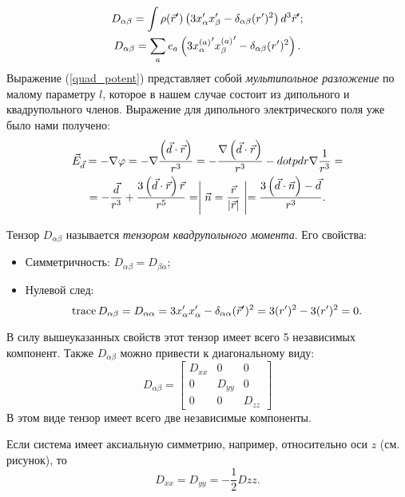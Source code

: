     \begin{gather*}
        D_{\alpha\beta} = \int\rho(\vec{r}')\left({3x_{\alpha}'x_{\beta}' - \delta_{\alpha\beta}(r')^2}\right)d^3\vec{r}';\\
        D_{\alpha\beta} = \sum_a e_a \left({3{x_{\alpha}^{(a)}}' {x_{\beta}^{(a)}}' - \delta_{\alpha\beta}(r')^2}\right).
    \end{gather*}
    Выражение (\ref{quad_potent}) представляет собой \textit{мультипольное разложение} по малому параметру $l$, которое в нашем случае состоит из дипольного и квадрупольного членов.
    Выражение для дипольного электрического поля уже было нами получено:
    \begin{gather*}
        \vec{E}_{\vec{d}} = -\nabla\varphi = -\nabla\frac{\left({\vec{d}\cdot\vec{r}}\right)}{r^3} = -\frac{\nabla\left({\vec{d}\cdot\vec{r}}\right)}{r^3} - dotp{d}{r}\nabla\frac{1}{r^3} = \\
        = -\frac{\vec{d}}{r^3} + \frac{3\left({\vec{d}\cdot\vec{r}}\right)\vec{r}}{r^5} = \Biggm| \vec{n} = \frac{\vec{r}}{\left|{\vec{r}}\right|} \Biggm| = \frac{3\left({\vec{d}\cdot\vec{n}}\right) - \vec{d}}{r^3}.
    \end{gather*}

    Тензор $D_{\alpha\beta}$ называется \textit{тензором квадрупольного момента}. Его свойства:
    \begin{itemize}
        \item Симметричность: $D_{\alpha\beta} = D_{\beta\alpha}$;
        \item Нулевой след: 
            \[
                \operatorname{trace} D_{\alpha\beta} = D_{\alpha\alpha} = 3x_{\alpha}'x_{\alpha}' - \delta_{\alpha\alpha}(\vec{r}')^2 = 3(r')^2 - 3(r')^2 = 0.
            \]
    \end{itemize}
    В силу вышеуказанных свойств этот тензор имеет всего 5 независимых компонент. Также $D_{\alpha\beta}$ можно привести к диагональному виду:
    \[
        D_{\alpha\beta} = \begin{bmatrix}
            D_{xx} & 0 & 0 \\
            0 & D_{yy} & 0 \\
            0 & 0 & D_{zz}
        \end{bmatrix}
    \]
    В этом виде тензор имеет всего две независимые компоненты.

        \parbox[h]{3cm}{
            
        }
        \hfill
        \parbox[h]{12cm}{
            Если система имеет аксиальную симметрию, например, относительно оси $z$ (см. рисунок), то
            \[
                D_{xx} = D_{yy} = -\frac 12 D{zz}.
            \]
        }
    
